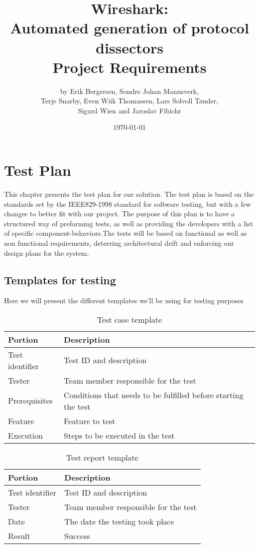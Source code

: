 \documentclass[a4paper, 11pt]{report}
\title{Wireshark:\\ Automated generation of protocol dissectors\\
		Project Requirements}
\author{by Erik Bergersen, Sondre Johan Mannsverk,\\ Terje Snarby,
		Even Wiik Thomassen, Lars Solvoll Tønder,\\ Sigurd Wien
		and Jaroslav Fibichr}
\date{\today}
\begin{document}
\chapter{Test Plan}

This chapter presents the test plan for our solution. The test plan is based on  the standards set by the IEEE829-1998 standard for software testing, but with a few changes to better fit with our project. The purpose of this plan is to have a structured way of preforming tests, as well as providing the developers with a list of specific component-behaviors.The tests will be based on functional as well as non functional requirements, deterring architectural drift and enforcing our design plans for the system.

\section{Templates for testing}

Here we will present the different templates we'll be using for testing purposes\\

\begin{table}[H]
\caption{Test case template}
\begin{tabular}{l l}
\hline\hline
Portion & Description\\[0.5ex]
\hline
Test identifier & Test ID and description\\[0.5ex]
Tester & Team member responsible for the test\\[0.5ex]
Prerequisites & Conditions that needs to be fulfilled before starting the test\\[0.5ex]
Feature & Feature to test\\[0.5ex]
Execution & Steps to be executed in the test\\[0.5ex]
\hline\hline
\end{tabular}
\end{table}

\begin{table}[H]
\caption{Test report template}
\begin{tabular}{l l}
\hline\hline
Portion & Description\\[0.5ex]
\hline
Test identifier & Test ID and description\\[0.5ex]
Tester & Team member responsible for the test\\[0.5ex]
Date & The date the testing took place\\[0.5ex]
Result & Success \\[0.5ex]
\hline\hline
\end{tabular}
\end{table}


\end{document}
